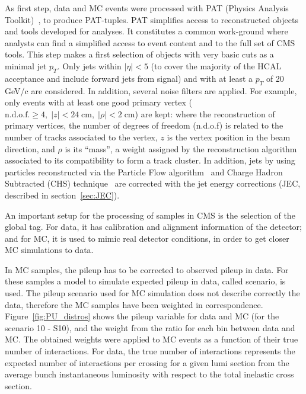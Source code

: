 As first step, data and MC events were processed with PAT (Physics Analysis Toolkit)~\cite{Adam:2010zza}, to produce PAT-tuples. PAT simplifies access to reconstructed objects and tools developed for analyses. It constitutes a common work-ground where analysts can find a simplified access to event content and to the full set of CMS tools. This step makes a first selection of objects with very basic cuts as a minimal jet $p_{T}$. Only jets within $|\eta|<5$ (to cover the majority of the HCAL acceptance and include forward jets from signal) and with at least a $p_{T}$ of 20 GeV/c are considered. In addition, several noise filters are applied. For example, only events with at least one good primary vertex ($\text{n.d.o.f.} \ge 4,\; |z|<24 \;\text{cm},\; |\rho|< 2 \;\text{cm}$) are kept: where the reconstruction of primary vertices, the number of degrees of freedom (n.d.o.f) is related to the number of tracks associated to the vertex, $z$ is the vertex position in the beam direction, and $\rho$ is its ``mass'', a weight assigned by the reconstruction algorithm associated to its compatibility to form a track cluster. In addition, jets by using particles reconstructed via the Particle Flow algorithm~\cite{CMS:2009nxa,CMS:2010eua,CMS:2010byl,CMS:2010aua} and Charge Hadron Subtracted (CHS) technique~\cite{Kirschenmann:1627818} are corrected with the jet energy corrections (JEC, described in section~\ref{sec:JEC}). %

An important setup for the processing of samples in CMS is the selection of the global tag. For data, it has calibration and alignment information of the detector; and for MC, it is used to mimic real detector conditions, in order to get closer MC simulations to data.

In MC samples, the pileup has to be corrected to observed pileup in data. For these samples a model to simulate expected pileup in data, called scenario, is used. The pileup scenario used for MC simulation does not describe correctly the data, therefore the MC samples have been weighted in correspondence. Figure~\ref{fig:PU_distros} shows the pileup variable for data and MC (for the scenario 10 - S10), and the weight from the ratio for each bin between data and MC. The obtained weights were applied to MC events as a function of their true number of interactions. For data, the true number of interactions represents the expected number of interactions per crossing for a given lumi section from the average bunch instantaneous luminosity with respect to the total inelastic cross section.

